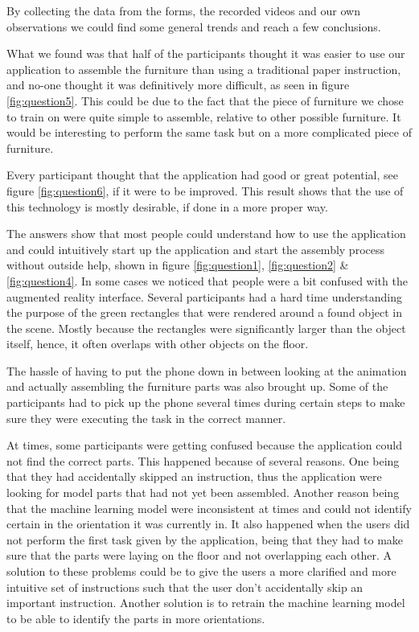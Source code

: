 By collecting the data from the forms, the recorded videos and our own observations we could find some general trends and reach a few conclusions.

What we found was that half of the participants thought it was easier to use our
application to assemble the furniture than using a traditional paper instruction, and no-one
thought it was definitively more difficult, as seen in figure \ref{fig:question5}. This could be due to the fact that the piece of furniture we 
chose to train on were quite simple to assemble, relative to other possible furniture. It would be interesting to perform the same task but on a more complicated piece of furniture.

Every participant thought that the application had good or great potential, see figure \ref{fig:question6}, if it were 
to be improved. This result shows that the use of this technology is mostly desirable, if 
done in a more proper way.

The answers show that most people could understand how to use the application and 
could intuitively start up the application and start the assembly process without outside 
help, shown in figure \ref{fig:question1}, \ref{fig:question2} \& \ref{fig:question4}. In some cases we noticed that people were a bit confused with the augmented reality 
interface. Several participants had a hard time understanding the purpose of the green 
rectangles that were rendered around a found object in the scene. Mostly because the 
rectangles were significantly larger than the object itself, hence, it often overlaps with 
other objects on the floor.

The hassle of having to put the phone down in between looking at the animation and 
actually assembling the furniture parts was also brought up. Some of the participants had 
to pick up the phone several times during certain steps to make sure they were executing 
the task in the correct manner.

At times, some participants were getting confused because the application could not find 
the correct parts. This happened because of several reasons. One being that they had 
accidentally skipped an instruction, thus the application were looking for model parts that 
had not yet been assembled. Another reason being that the machine learning model were 
inconsistent at times and could not identify certain in the orientation it was currently in. It 
also happened when the users did not perform 
the first task given by the application, being that they had to make sure that the parts were 
laying on the floor and not overlapping each other. A solution to these problems could be 
to give the users a more clarified and more intuitive set of instructions such that the user 
don't accidentally skip an important instruction. Another solution is to retrain the machine 
learning model to be able to identify the parts in more orientations. 

